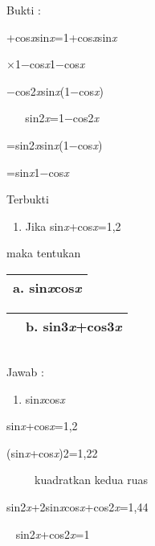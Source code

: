 \documentclass[11pt,fleqn]{book} %
\begin{document}
\noindent Bukti : 

+cos\textit{x}sin\textit{x}=1+cos\textit{x}sin\textit{x}

\noindent $\times$1$\mathrm{-}$cos\textit{x}1$\mathrm{-}$cos\textit{x}

$\mathrm{-}$cos2\textit{x}sin\textit{x}(1$\mathrm{-}$cos\textit{x})

\noindent ~ ~ sin2\textit{x}=1$\mathrm{-}$cos2\textit{x}

\noindent =sin2\textit{x}sin\textit{x}(1$\mathrm{-}$cos\textit{x})

\noindent =sin\textit{x}1$\mathrm{-}$cos\textit{x}

\noindent Terbukti 

\begin{enumerate}
\item  Jika sin\textit{x}+cos\textit{x}=1,2
\end{enumerate}

\noindent maka tentukan 

\begin{tabular}{|p{0.5in}|} \hline 
a. sin\textit{x}cos\textit{x} \\ \hline 
\end{tabular}



\begin{tabular}{|p{0.0in}|p{0.7in}|} \hline 
 & b. sin3\textit{x}+cos3\textit{x} \\ \hline 
\end{tabular}



\begin{tabular}{|p{0.0in}|} \hline 
 \\ \hline 
\end{tabular}

Jawab : 

\begin{enumerate}
\item  sin\textit{x}cos\textit{x}
\end{enumerate}

\noindent sin\textit{x}+cos\textit{x}=1,2

\noindent (sin\textit{x}+cos\textit{x})2=1,22

\noindent ~ ~ ~ kuadratkan kedua ruas 

\noindent sin2\textit{x}+2sin\textit{x}cos\textit{x}+cos2\textit{x}=1,44

\noindent ~ sin2\textit{x}+cos2\textit{x}=1
\end{document}
